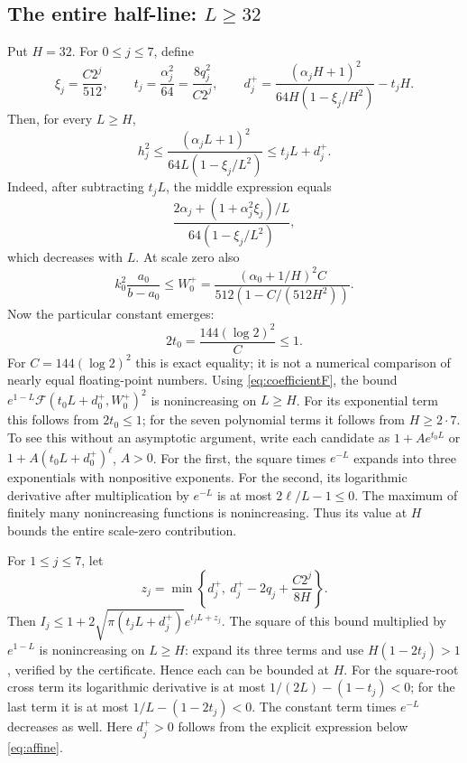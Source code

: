 \documentclass[10pt]{article}
\begin{document}
\subsection{The entire half-line: $L\ge32$}
Put $H=32$. For $0\le j\le7$, define
\[
 \xi_j=\frac{C2^j}{512},\qquad
 t_j=\frac{\alpha_j^2}{64}=\frac{8q_j^2}{C2^j},\qquad
 d_j^+=\frac{(\alpha_jH+1)^2}{64H(1-\xi_j/H^2)}-t_jH.
\]
Then, for every $L\ge H$,
\begin{equation}\label{eq:affine}
 h_j^2\le\frac{(\alpha_jL+1)^2}{64L(1-\xi_j/L^2)}
 \le t_jL+d_j^+.
\end{equation}
Indeed, after subtracting $t_jL$, the middle expression equals
\[
 \frac{2\alpha_j+(1+\alpha_j^2\xi_j)/L}
      {64(1-\xi_j/L^2)},
\]
which decreases with $L$. At scale zero also
\[
 k_0^2\frac{a_0}{b-a_0}\le
 W_0^+=\frac{(\alpha_0+1/H)^2 C}{512(1-C/(512H^2))}.
\]
Now the particular constant emerges:
\begin{equation}\label{eq:critical}
 2t_0=\frac{144(\log2)^2}{C}\le1.
\end{equation}
For $C=144(\log2)^2$ this is exact equality; it is not a numerical
comparison of nearly equal floating-point numbers.
Using \eqref{eq:coefficientF}, the bound
$e^{1-L}\mathcal F(t_0L+d_0^+,W_0^+)^2$ is nonincreasing on $L\ge H$.
For its exponential term this follows from $2t_0\le1$; for the seven
polynomial terms it follows from $H\ge2\cdot7$.
To see this without an asymptotic argument, write each candidate as
$1+A e^{t_0L}$ or $1+A(t_0L+d_0^+)^\ell$, $A>0$.
For the first, the square times $e^{-L}$ expands into three exponentials
with nonpositive exponents. For the second, its logarithmic derivative
after multiplication by $e^{-L}$ is at most $2\ell/L-1\le0$.
The maximum of finitely many nonincreasing functions is nonincreasing.
Thus its value at $H$ bounds the entire scale-zero contribution.

For $1\le j\le7$, let
\[
 z_j=\min\left\{d_j^+,\ d_j^+-2q_j+\frac{C2^j}{8H}\right\}.
\]
Then $I_j\le1+2\sqrt{\pi(t_jL+d_j^+)}e^{t_jL+z_j}$.
The square of this bound multiplied by $e^{1-L}$ is nonincreasing on
$L\ge H$: expand its three terms and use
$H(1-2t_j)>1$, verified by the certificate. Hence each can be bounded at $H$.
For the square-root cross term its logarithmic derivative is at most
$1/(2L)-(1-t_j)<0$; for the last term it is at most
$1/L-(1-2t_j)<0$. The constant term times $e^{-L}$ decreases as well.
Here $d_j^+>0$ follows from the explicit expression below
\eqref{eq:affine}.
\end{document}
